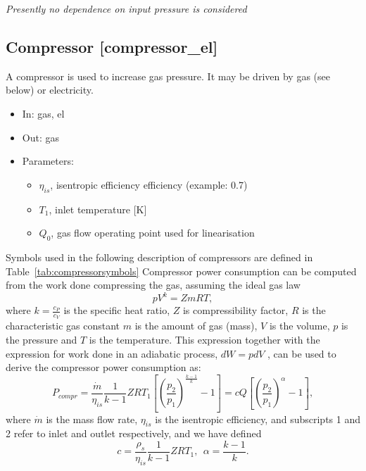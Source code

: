 \documentclass[12pt]{article}
\begin{document}
\noindent 
\textit{Presently no dependence on input pressure is considered}



\subsection{Compressor [compressor\_el]}
A compressor is used to increase gas pressure. It may be driven by gas (see below) or electricity.


\begin{itemize}
\item In: gas, el
\item Out: gas
\item Parameters:
\begin{itemize}[noitemsep,topsep=0pt]
	\item $\eta_{is}$,  isentropic efficiency efficiency (example: 0.7)
	\item $T_1$, inlet temperature [K]
	\item $Q_0$, gas flow operating point used for linearisation
\end{itemize}
\end{itemize}






\medskip\noindent
Symbols used in the following description of compressors are defined in Table~\ref{tab:compressorsymbols}
Compressor power consumption can be computed from the work done compressing the gas, assuming the ideal gas law 
\begin{equation}
 	 pV^{k}=ZmRT, 
\end{equation}
where  \( k=\frac{c_{P}}{c_{V}} \)  is the specific heat ratio,  \( Z \)  is compressibility factor,  \( R \)  is the characteristic gas constant  \( m \)  is the amount of gas (mass),  \( V \)  is the volume,  \( p \)  is the pressure and  \( T \)  is the temperature. This expression together with the expression for work done in an adiabatic process,  \( dW=pdV \) , can be used to derive the compressor power consumption as:
\begin{equation}
	P_{compr}=\frac{\dot{m}}{ \eta _{is}}\frac{1}{k-1}ZRT_{1} \left[  \left( \frac{p_{2}}{p_{1}} \right) ^{\frac{k-1}{k}}-1 \right] 
		=c Q \left[  \left( \frac{p_{2}}{p_{1}} \right) ^{ \alpha }-1 \right] , 
\end{equation} 
where  \( \dot{m} \)  is the mass flow rate,  \(  \eta _{is} \)  is the isentropic efficiency, and subscripts 1 and 2 refer to inlet and outlet respectively, and we have defined
\begin{equation}
	c=\frac{ \rho _{s}}{ \eta _{is}}\frac{1}{k-1}ZRT_{1},~~ \alpha =\frac{k-1}{k}. 
\end{equation}
\end{document}
